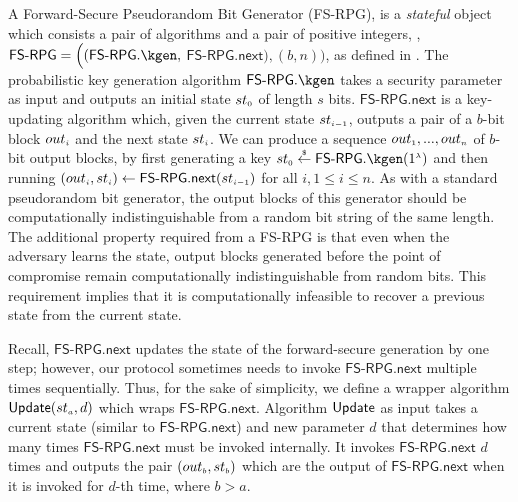 A Forward-Secure Pseudorandom Bit Generator (FS-RPG), is a \emph{stateful} object which consists a pair of algorithms and a pair of positive integers, \ie, $\mathsf{FS\text{-}RPG} = \Big((\mathsf{FS\text{-}RPG}.\kgen, $ $ \mathsf{FS\text{-}RPG.next}),( b, n)\Big)$, as defined in \cite{BellareY03}.  The probabilistic key generation algorithm $\mathsf{FS\text{-}RPG}.\kgen$ takes a security parameter as input and outputs an initial state ${st}_{\scriptscriptstyle 0}$ of length $s$ bits. $\mathsf{FS\text{-}RPG.next}$ is a key-updating algorithm which, given the current state ${st}_{\scriptscriptstyle i-1}$, outputs a pair of a $b$-bit block ${out}_{\scriptscriptstyle i}$ and the next state ${st}_{\scriptscriptstyle i}$. We can produce a sequence  ${out}_{\scriptscriptstyle 1},..., {out}_{\scriptscriptstyle n}$  of  $b$-bit output blocks, by first generating a key  ${st}_{\sss 0}\stackrel{\sss \$}\leftarrow\mathsf{FS\text{-}RPG}.\kgen(1^{\sss \lambda})$ and then running $({out}_{\scriptscriptstyle i}, st_{\scriptscriptstyle i})\leftarrow  \mathsf{FS\text{-}RPG.next} (st_{\scriptscriptstyle i-1})$ for all $i, 1\leq i\leq n$. As with a standard pseudorandom bit generator, the output blocks of this generator should be computationally indistinguishable from a random bit
string of the same length. The additional property required from a
FS-RPG is that even when the
adversary learns the state, output blocks generated before the point of
compromise remain computationally indistinguishable from random bits.
This requirement implies that it is computationally infeasible to
recover a previous state from the current state. %


Recall, $\mathsf{FS\text{-}RPG.next}$ updates the state of the forward-secure generation by one step; however, our protocol sometimes needs to invoke $\mathsf{FS\text{-}RPG.next}$ multiple times sequentially. Thus, for the sake of simplicity, we define a wrapper algorithm $ \mathsf{Update}({st}_{\scriptscriptstyle a}, d)$ which wraps  $\mathsf{FS\text{-}RPG.next}$. Algorithm $\mathsf{Update}$  as input takes a current state (similar to $\mathsf{FS\text{-}RPG.next}$) and new parameter $d$ that determines how many times   $\mathsf{FS\text{-}RPG.next}$ must be invoked internally. It invokes  $\mathsf{FS\text{-}RPG.next}$ $d$ times and outputs the pair  $({out}_{\scriptscriptstyle b}, {st}_{\scriptscriptstyle b})$  which are the output of $\mathsf{FS\text{-}RPG.next}$ when it is invoked for $d$-th time, where $ b> a$. 




